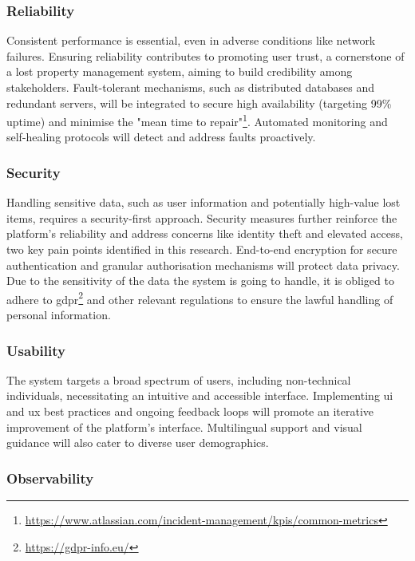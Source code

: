 \subsubsection{Reliability} 

Consistent performance is essential, even in adverse conditions like network failures. Ensuring reliability contributes to promoting user trust, a cornerstone of a lost property management system, aiming to build credibility among stakeholders. Fault-tolerant mechanisms, such as distributed databases and redundant servers, will be integrated to secure high availability (targeting 99\% uptime) and minimise the "mean time to repair"\footnote{\url{https://www.atlassian.com/incident-management/kpis/common-metrics}}. Automated monitoring and self-healing protocols will detect and address faults proactively.

\subsubsection{Security}

Handling sensitive data, such as user information and potentially high-value lost items, requires a security-first approach. Security measures further reinforce the platform's reliability and address concerns like identity theft and elevated access, two key pain points identified in this research. End-to-end encryption for secure authentication and granular authorisation mechanisms will protect data privacy. Due to the sensitivity of the data the system is going to handle, it is obliged to adhere to \ac{gdpr}\footnote{\url{https://gdpr-info.eu/}} and other relevant regulations to ensure the lawful handling of personal information.

\subsubsection{Usability}

The system targets a broad spectrum of users, including non-technical individuals, necessitating an intuitive and accessible interface. Implementing \ac{ui} and \ac{ux} best practices and ongoing feedback loops will promote an iterative improvement of the platform's interface. Multilingual support and visual guidance will also cater to diverse user demographics.

\subsubsection{Observability}

